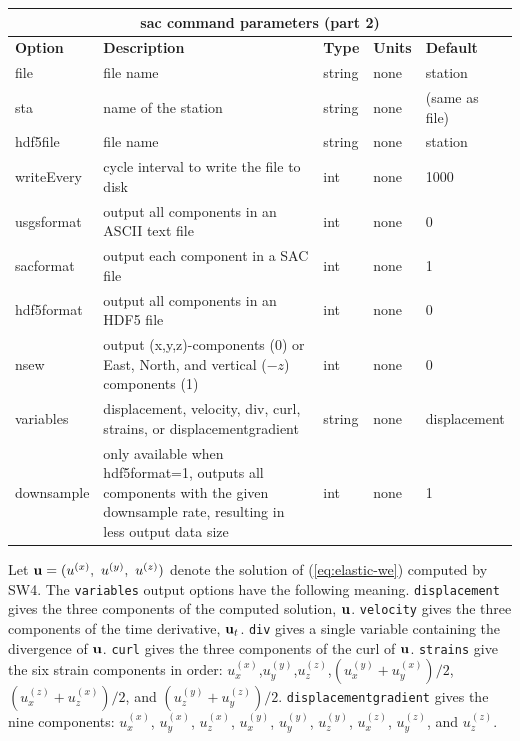 \documentclass[11pt]{report}
\begin{document}
\begin{center}
\begin{tabular}{|l|p{8cm}|l|l|l|} \hline
\multicolumn{5}{|c|}{\bf sac command parameters (part 2)}\\ \hline
\bf{Option} & \bf{Description} & \bf{Type} & \bf{Units} & \bf{Default} \\ \hline \hline
file & file name  & string & none & station \\ \hline
sta & name of the station & string & none & (same as file) \\ \hline
hdf5file & file name  & string & none & station \\ \hline
writeEvery & cycle interval to write the file to disk & int & none & 1000 \\ \hline
%
usgsformat & output all components in an ASCII text file & int & none & 0 \\ \hline
sacformat & output each component in a SAC file & int & none & 1 \\ \hline 
hdf5format & output all components in an HDF5 file & int & none & 0 \\ \hline 
\hline
nsew & output (x,y,z)-components (0) or East, North, and vertical ($-z$) components (1)& int & none & 0 \\ \hline
variables & displacement, velocity, div, curl, strains, or displacementgradient & string & none & displacement \\ \hline
downsample & only available when hdf5format=1, outputs all components with the given downsample rate, resulting in less output data size & int & none & 1\\ \hline
\end{tabular}
\end{center}
Let ${\bf u}=(u^{(x)},\ u^{(y)},\ u^{(z)})$ denote the solution of (\ref{eq:elastic-we}) computed by SW4. 
The {\tt variables} output options have the following meaning. {\tt displacement} gives the three components of the computed solution, ${\bf u}$. {\tt velocity} gives the three components of the time derivative, ${\bf u}_t$. {\tt div} gives a single variable containing the divergence of ${\bf u}$. {\tt curl} gives the three components of the curl of ${\bf u}$. {\tt strains} give the six strain components in order: $u^{(x)}_x$,$u^{(y)}_y$,$u^{(z)}_z$,$(u^{(y)}_x+u^{(x)}_y)/2$, $(u^{(z)}_x+u^{(x)}_z)/2$, and
$(u^{(y)}_z+u^{(z)}_y)/2$. {\tt displacementgradient} gives the nine components: $u^{(x)}_x$, $u^{(x)}_y$, $u^{(x)}_z$,
$u^{(y)}_x$, $u^{(y)}_y$, $u^{(y)}_z$, $u^{(z)}_x$, $u^{(z)}_y$, and $u^{(z)}_z$. \par
\end{document}
